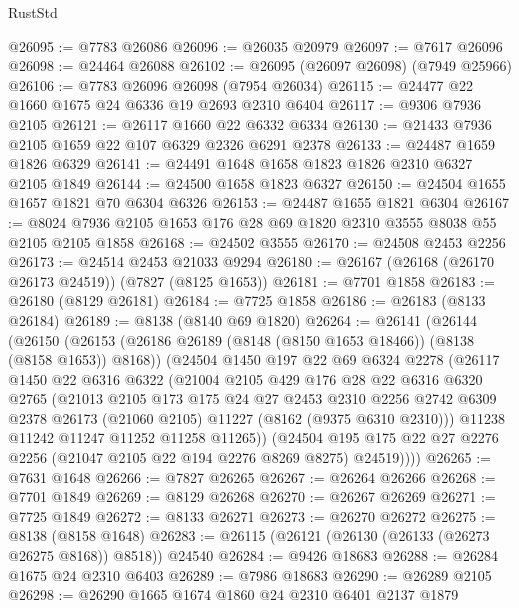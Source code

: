 \begin{lexlean}{RustStd}
\begin{coremodule}
@26095 := @7783 @26086
@26096 := @26035 @20979
@26097 := @7617 @26096
@26098 := @24464 @26088
@26102 := @26095 (@26097 @26098) (@7949 @25966)
@26106 := @7783 @26096 @26098 (@7954 @26034)
@26115 := @24477 @22 @1660 @1675 @24 @6336 @19 @2693 @2310 @6404
@26117 := @9306 @7936 @2105
@26121 := @26117 @1660 @22 @6332 @6334
@26130 := @21433 @7936 @2105 @1659 @22 @107 @6329 @2326 @6291 @2378
@26133 := @24487 @1659 @1826 @6329
@26141 := @24491 @1648 @1658 @1823 @1826 @2310 @6327 @2105 @1849
@26144 := @24500 @1658 @1823 @6327
@26150 := @24504 @1655 @1657 @1821 @70 @6304 @6326
@26153 := @24487 @1655 @1821 @6304
@26167 := @8024 @7936 @2105 @1653 @176 @28 @69 @1820 @2310 @3555 @8038 @55 @2105 @2105 @1858
@26168 := @24502 @3555
@26170 := @24508 @2453 @2256
@26173 := @24514 @2453 @21033 @9294
@26180 := @26167 (@26168 (@26170 @26173 @24519)) (@7827 (@8125 @1653))
@26181 := @7701 @1858
@26183 := @26180 (@8129 @26181)
@26184 := @7725 @1858
@26186 := @26183 (@8133 @26184)
@26189 := @8138 (@8140 @69 @1820)
@26264 := @26141
    (@26144
      (@26150
        (@26153 (@26186 @26189 (@8148 (@8150 @1653 @18466)) (@8138 (@8158 @1653)) @8168))
        (@24504
          @1450
          @197
          @22
          @69
          @6324
          @2278
          (@26117
            @1450
            @22
            @6316
            @6322
            (@21004
              @2105
              @429
              @176
              @28
              @22
              @6316
              @6320
              @2765
              (@21013
                @2105
                @173
                @175
                @24
                @27
                @2453
                @2310
                @2256
                @2742
                @6309
                @2378
                @26173
                (@21060 @2105)
                @11227
                (@8162 (@9375 @6310 @2310)))
              @11238
              @11242
              @11247
              @11252
              @11258
              @11265))
          (@24504 @195 @175 @22 @27 @2276 @2256 (@21047 @2105 @22 @194 @2276 @8269 @8275) @24519))))
@26265 := @7631 @1648
@26266 := @7827 @26265
@26267 := @26264 @26266
@26268 := @7701 @1849
@26269 := @8129 @26268
@26270 := @26267 @26269
@26271 := @7725 @1849
@26272 := @8133 @26271
@26273 := @26270 @26272
@26275 := @8138 (@8158 @1648)
@26283 := @26115 (@26121 (@26130 (@26133 (@26273 @26275 @8168)) @8518)) @24540
@26284 := @9426 @18683
@26288 := @26284 @1675 @24 @2310 @6403
@26289 := @7986 @18683
@26290 := @26289 @2105
@26298 := @26290 @1665 @1674 @1860 @24 @2310 @6401 @2137 @1879

\end{coremodule}
\end{lexlean}
